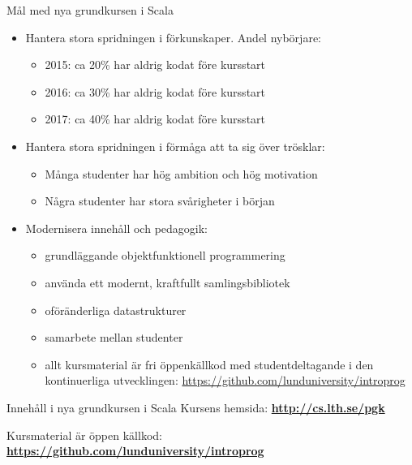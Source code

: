 \begin{Slide}{Mål med nya grundkursen i Scala}
\begin{itemize}
  \item Hantera stora spridningen i förkunskaper. Andel nybörjare:
  \begin{itemize}
    \item 2015: ca 20\% har aldrig kodat före kursstart
    \item 2016: ca 30\% har aldrig kodat före kursstart
    \item 2017: ca 40\% har aldrig kodat före kursstart
  \end{itemize}
  \item Hantera stora spridningen i förmåga att ta sig över trösklar:
  \begin{itemize}
    \item Många studenter har hög ambition och hög motivation
    \item Några studenter har stora svårigheter i början
  \end{itemize}
  \item Modernisera innehåll och pedagogik:
  \begin{itemize}
    \item grundläggande objektfunktionell programmering
    \item använda ett modernt, kraftfullt samlingsbibliotek
    \item oföränderliga datastrukturer
    \item samarbete mellan studenter
    \item allt kursmaterial är fri öppenkällkod med studentdeltagande i den kontinuerliga utvecklingen:
    \url{https://github.com/lunduniversity/introprog}
  \end{itemize}
\end{itemize}
\end{Slide}


\begin{Slide}{Innehåll i nya grundkursen i Scala}\SlideFontTiny
Kursens hemsida: \textbf{\url{http://cs.lth.se/pgk}} \\ \vspace{1em}

\noindent\resizebox{0.8\columnwidth}{!}{\fontsize{8}{10}\selectfont

}

\vspace{1em}
Kursmaterial är öppen källkod: \textbf{\url{https://github.com/lunduniversity/introprog}}
\end{Slide}



